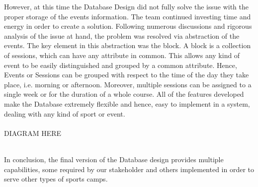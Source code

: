 \documentclass{l3proj}
\begin{document}
\par However, at this time the Database Design did not fully solve the issue with the proper storage of the events information. The team continued investing time and energy in order to create a solution. Following numerous discussions and rigorous analysis of the issue at hand, the problem was resolved via abstraction of the events. The key element in this abstraction was the block. A block is a collection of sessions, which can have any attribute in common. This allows any kind of event to be easily distinguished and grouped by a common attribute. Hence, Events or Sessions can be grouped with respect to the time of the day they take place, i.e. morning or afternoon. Moreover, multiple sessions can be assigned to a single week or for the duration of a whole course. All of the features developed make the Database extremely flexible and hence, easy to implement in a system, dealing with any kind of sport or event.\\
\\ 
{\LARGE{DIAGRAM HERE}}\\
\\
\par In conclusion, the final version of the Database design provides multiple capabilities, some required by our stakeholder and others implemented in order to  serve other types of sports camps. \\

\end{document}
